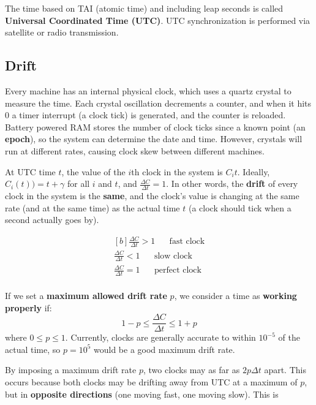 \documentclass{article}
\begin{document}
The time based on TAI (atomic time) and including leap seconds is called \textbf{Universal Coordinated Time (UTC)}. UTC synchronization is performed via satellite or radio transmission.

\subsection{Drift}

Every machine has an internal physical clock, which uses a quartz crystal to measure the time. Each crystal oscillation decrements a counter, and when it hits 0 a timer interrupt (a clock tick) is generated, and the counter is reloaded. Battery powered RAM stores the number of clock ticks since a known point (an \textbf{epoch}), so the system can determine the date and time. However, crystals will run at different rates, causing clock skew between different machines.

At UTC time $t$, the value of the $i$th clock in the system is $C_i{t}$. Ideally, $C_i(t)) = t + \gamma$ for all $i$ and $t$, and $\frac{\Delta C}{\Delta t} = 1$. In other words, the \textbf{drift} of every clock in the system is the \textbf{same}, and the clock's value is changing at the same rate (and at the same time) as the actual time $t$ (a clock should tick when a second actually goes by).

\begin{equation}
\begin{aligned}[b]
	\frac{\Delta C}{\Delta t} > 1
	\;\;\;\;\;\; \text{fast clock} \\
	\frac{\Delta C}{\Delta t} < 1
	\;\;\;\;\;\; \text{slow clock} \\
	\frac{\Delta C}{\Delta t} = 1
	\;\;\;\;\;\; \text{perfect clock} \\
\end{aligned}
\end{equation}

If we set a \textbf{maximum allowed drift rate} $p$, we consider a time as \textbf{working properly} if:
\begin{equation}
	1 - p \leq \frac{\Delta C}{\Delta t} \leq 1 + p
\end{equation}
where $0 \leq p \leq 1$. Currently, clocks are generally accurate to within $10^{-5}$ of the actual time, so $p = 10^{5}$ would be a good maximum drift rate.

By imposing a maximum drift rate $p$, two clocks may as far as $2p\Delta t$ apart. This occurs because both clocks may be drifting away from UTC at a maximum of $p$, but in \textbf{opposite directions} (one moving fast, one moving slow). This is
\end{document}

